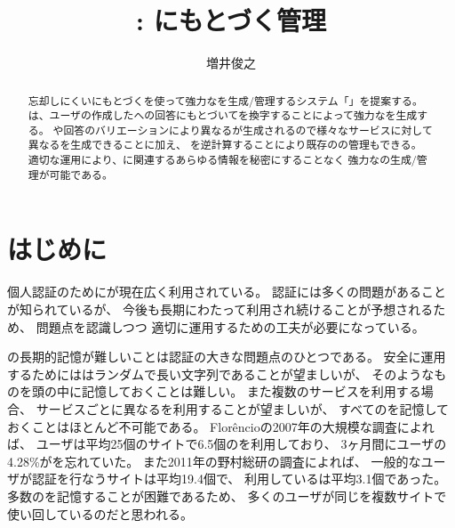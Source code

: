 \documentclass[twoside]{wiss}
\begin{document}
\title{{\EP}: {\EM}にもとづく{\PW}管理}

\author{増井俊之}

\begin{abstract}
忘却しにくい{\EM}にもとづく{\SQ}を使って強力な{\PW}を生成/管理するシステム「\textsf{\EP}」を提案する。
{\EP}は、ユーザの作成した{\SQ}への回答にもとづいて{\SS}を換字することによって強力な{\PW}を生成する。
{\SS}や回答のバリエーションにより異なる{\PW}が生成されるので様々なサービスに対して異なる{\PW}を生成できることに加え、
{\SS}を逆計算することにより既存の{\PW}の管理もできる。
適切な運用により、{\PW}に関連するあらゆる情報を秘密にすることなく
強力な{\PW}の生成/管理が可能である。
\end{abstract}

\maketitle

\section{はじめに}

個人認証のために{\PW}が現在広く利用されている。
{\PW}認証には多くの問題があることが知られているが\cite{増井_ユニマガ}、
今後も長期にわたって利用され続けることが予想されるため\cite{Herley:2009:PSS:1601990.1602010}、
問題点を認識しつつ
適切に運用するための工夫が必要になっている。

{\PW}の長期的記憶が難しいことは{\PW}認証の大きな問題点のひとつである。
安全に運用するためには{\PW}はランダムで長い文字列であることが望ましいが、
そのようなものを頭の中に記憶しておくことは難しい。
また複数のサービスを利用する場合、
サービスごとに異なる{\PW}を利用することが望ましいが、
すべての{\PW}を記憶しておくことはほとんど不可能である。
%
Flor\^{e}ncioの2007年の大規模な調査によれば、
ユーザは平均25個のサイトで6.5個の{\PW}を利用しており、
3ヶ月間にユーザの4.28\%が{\PW}を忘れていた\cite{Florencio:2007:LSW:1242572.1242661}。
また2011年の野村総研の調査によれば、
一般的なユーザが{\PW}認証を行なうサイトは平均19.4個で、
利用している{\PW}は平均3.1個であった\cite{野村総研}。
多数の{\PW}を記憶することが困難であるため、
多くのユーザが同じ{\PW}を複数サイトで使い回しているのだと思われる。
\end{document}

